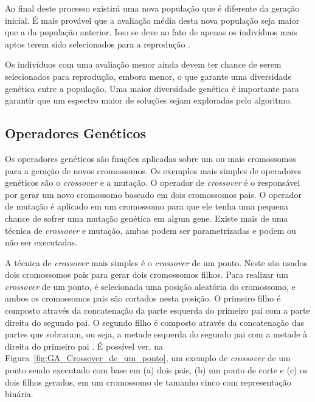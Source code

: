 \documentclass[12pt,oneside,a4paper,english,french,spanish,brazil,]{abntex2}
\begin{document}
Ao final deste processo existirá uma nova população que é diferente da geração inicial. É mais provável que a avaliação média desta nova população seja maior que a da população anterior. Isso se deve ao fato de apenas os indivíduos mais aptos terem sido selecionados para a reprodução \cite{linden:2008}.

Os indivíduos com uma avaliação menor ainda devem ter chance de serem selecionados para reprodução, embora menor, o que garante uma diversidade genética entre a população. Uma maior diversidade genética é importante para garantir que um espectro maior de soluções sejam exploradas pelo algoritmo.

\subsection{Operadores Genéticos}

Os operadores genéticos são funções aplicadas sobre um ou mais cromossomos para a geração de novos cromossomos. Os exemplos mais simples de operadores genéticos são o \textit{crossover} e a mutação. O operador de \textit{crossover} é o responsável por gerar um novo cromossomo baseado em dois cromossomos pais. O operador de mutação é aplicado em um cromossomo para que ele tenha uma pequena chance de sofrer uma mutação genética em algum gene. Existe mais de uma técnica de \textit{crossover} e mutação, ambas podem ser parametrizadas e podem ou não ser executadas.

A técnica de \textit{crossover} mais simples é o \textit{crossover} de um ponto. Neste são usados dois cromossomos pais para gerar dois cromossomos filhos. Para realizar um \textit{crossover} de um ponto, é selecionada uma posição aleatória do cromossomo, e ambos os cromossomos pais são cortados nesta posição. O primeiro filho é composto através da concatenação da parte esquerda do primeiro pai com a parte direita do segundo pai. O segundo filho é composto através da concatenação das partes que sobraram, ou seja, a metade esquerda do segundo pai com a metade à direita do primeiro pai \cite{linden:2008}. É possível ver, na Figura~\ref{fig:GA_Crossover_de_um_ponto}, um exemplo de \textit{crossover}  de um ponto sendo executado com base em (a) dois pais, (b) um ponto de corte e (c) os dois filhos gerados, em um cromossomo de tamanho cinco com representação binária.
\end{document}
